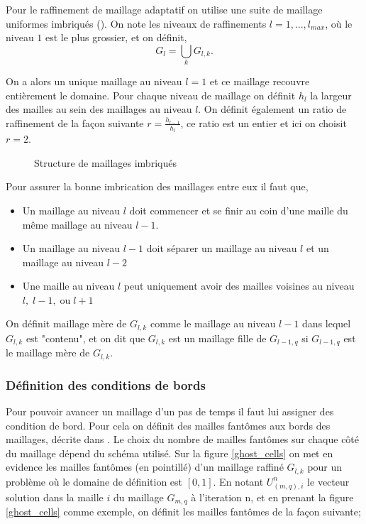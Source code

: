 \documentclass[12pt]{article}
\begin{document}
Pour le raffinement de maillage adaptatif on utilise une suite de maillage uniformes imbriqués (\cite{Berger_Collela98}). On note les niveaux de raffinements \( l = 1, ..., l_{max} \), où le niveau \(1\) est le plus grossier, et on définit, 
\begin{equation}
    G_l = \bigcup_k G_{l, k}.
\end{equation}

On a alors un unique maillage au niveau \( l = 1 \) et ce maillage recouvre entièrement le domaine. Pour chaque niveau de maillage on définit \( h_l \) la largeur des mailles au sein des maillages au niveau \( l \). On définit également un ratio de raffinement de la façon suivante \( r = \frac{h_{l-1}}{h_l} \), ce ratio est un entier et ici on choisit \( r = 2 \).

\begin{figure}[htbp]
    \centering
    
    \caption{Structure de maillages imbriqués}
    \label{nested_grid}
\end{figure}

Pour assurer la bonne imbrication des maillages entre eux il faut que, 
\begin{itemize}
    \item Un maillage au niveau \(l\) doit commencer et se finir au coin d'une maille du même maillage au niveau \(l-1\).
    \item Un maillage au niveau \(l-1\) doit séparer un maillage au niveau \(l\) et un maillage au niveau \(l-2\)
    \item Une maille au niveau \(l\) peut uniquement avoir des mailles voisines au niveau \(l, \; l-1, \; \text{ou} \; l+1\)
\end{itemize}

On définit maillage mère de \( G_{l, k} \) comme le maillage au niveau \(l-1\) dans lequel \( G_{l, k} \) est "contenu", et on dit que \( G_{l, k} \) est un maillage fille de \( G_{l-1, q} \) si \( G_{l-1, q} \) est le maillage mère de \( G_{l, k} \). 

\subsubsection{Définition des conditions de bords}
Pour pouvoir avancer un maillage d'un pas de temps il faut lui assigner des condition de bord. Pour cela on définit des mailles fantômes aux bords des maillages, décrite dans \cite{Berger_Collela98}. Le choix du nombre de mailles fantômes sur chaque côté du maillage dépend du schéma utilisé.
Sur la figure \ref{ghost_cells} on met en evidence les mailles fantômes (en pointillé) d'un maillage raffiné \( G_{l, k} \) pour un problème où le domaine de définition est \( [0, 1] \). 
En notant \(U_{(m, q), i}^n\) le vecteur solution dans la maille \( i\) du maillage \(G_{m, q}\) à l'iteration n, et en prenant la figure \ref{ghost_cells} comme exemple, on définit les mailles fantômes de la façon suivante; 
\end{document}

